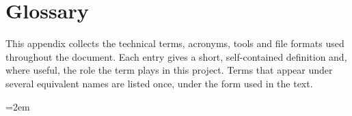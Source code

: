 \chapter{Glossary}
\label{app:glossary}

This appendix collects the technical terms, acronyms, tools and file formats used throughout the document. Each entry gives a short, self-contained definition and, where useful, the role the term plays in this project. Terms that appear under several equivalent names are listed once, under the form used in the text.

\emergencystretch=2em   %

\renewcommand*{\glossarysection}[2][]{}   %
